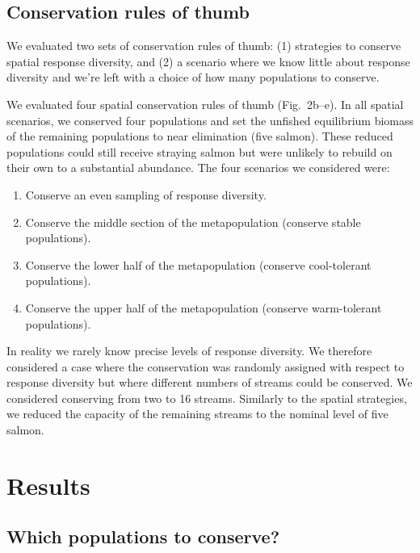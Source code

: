 \subsection{Conservation rules of thumb}

We evaluated two sets of conservation rules of thumb: (1) strategies to conserve spatial response diversity, and (2) a scenario where we know little about response diversity and we're left with a choice of how many populations to conserve.

We evaluated four spatial conservation rules of thumb (Fig.~2b--e). In all spatial scenarios, we conserved four populations and set the unfished equilibrium biomass of the remaining populations to near elimination (five salmon). These reduced populations could still receive straying salmon but were unlikely to rebuild on their own to a substantial abundance. The four scenarios we considered were:

\begin{enumerate}
\def\labelenumi{\arabic{enumi}.}
\itemsep1pt\parskip0pt
\item
  Conserve an even sampling of response diversity.
\item
  Conserve the middle section of the metapopulation (conserve stable populations).
\item
  Conserve the lower half of the metapopulation (conserve cool-tolerant populations).
\item
  Conserve the upper half of the metapopulation (conserve warm-tolerant populations).
\end{enumerate}

In reality we rarely know precise levels of response diversity. We therefore considered a case where the conservation was randomly assigned with respect to response diversity but where different numbers of streams could be conserved. We considered conserving from two to 16 streams. Similarly to the spatial strategies, we reduced the capacity of the remaining streams to the nominal level of five salmon.

\section{Results}

\subsection{Which populations to conserve?}

